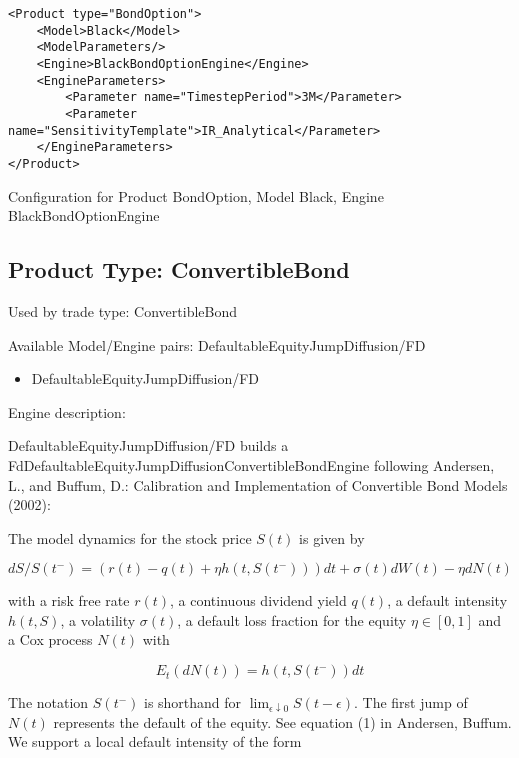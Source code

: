 \begin{longlisting}
\begin{verbatim}
<Product type="BondOption">
    <Model>Black</Model>
    <ModelParameters/>
    <Engine>BlackBondOptionEngine</Engine>
    <EngineParameters>
        <Parameter name="TimestepPeriod">3M</Parameter>
        <Parameter name="SensitivityTemplate">IR_Analytical</Parameter>
    </EngineParameters>
</Product>
\end{verbatim}
\caption{Configuration for Product BondOption, Model Black, Engine BlackBondOptionEngine}
\label{lst:peconfig_BondOption_Black_BlackBondOptionEngine}
\end{longlisting}

\subsection{Product Type: ConvertibleBond}

Used by trade type: ConvertibleBond

Available Model/Engine pairs: DefaultableEquityJumpDiffusion/FD

\begin{itemize}
\item DefaultableEquityJumpDiffusion/FD
\end{itemize}

Engine description:

DefaultableEquityJumpDiffusion/FD builds a FdDefaultableEquityJumpDiffusionConvertibleBondEngine following Andersen, L.,
and Buffum, D.: Calibration and Implementation of Convertible Bond Models (2002):

The model dynamics for the stock price $S(t)$ is given by

\begin{equation}
  dS / S(t^-) = (r(t) - q(t) + \eta h(t, S(t^-))) dt + \sigma(t) dW(t) - \eta dN(t)
\end{equation}

with a risk free rate $r(t)$, a continuous dividend yield $q(t)$, a default intensity $h(t,S)$, a volatility
$\sigma(t)$, a default loss fraction for the equity $\eta \in [0,1]$ and a Cox process $N(t)$ with

\begin{equation}
  E_t(dN(t)) = h(t,S(t^-)) dt
\end{equation}

The notation $S(t^-)$ is shorthand for $\lim_{\epsilon\downarrow 0} S(t-\epsilon)$. The first jump of $N(t)$ represents
the default of the equity. See equation (1) in Andersen, Buffum. We support a local default intensity of the form

